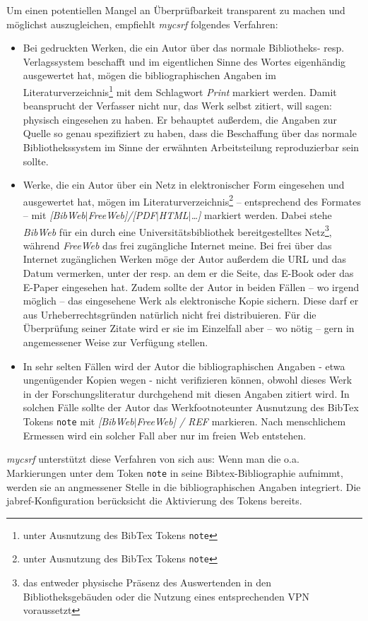 Um einen potentiellen Mangel an Überprüfbarkeit transparent zu machen und
möglichst auszugleichen, empfiehlt \emph{mycsrf} folgendes Verfahren:

\begin{itemize}
  \item Bei gedruckten Werken, die ein Autor über das normale Bibliotheks- resp.
  Verlagssystem beschafft und im eigentlichen Sinne des Wortes eigenhändig
  ausgewertet hat, mögen die bibliographischen Angaben im
  Literaturverzeichnis\footnote{unter Ausnutzung des BibTex Tokens
  \texttt{note}} mit dem Schlagwort \emph{Print} markiert werden. Damit
  beansprucht der Verfasser nicht nur, das Werk selbst zitiert, will sagen:
  physisch eingesehen zu haben. Er behauptet außerdem, die Angaben zur Quelle so
  genau spezifiziert zu haben, dass die Beschaffung über das normale
  Bibliothekssystem im Sinne der erwähnten Arbeitsteilung reproduzierbar sein
  sollte.
  \item Werke, die ein Autor über ein Netz in elektronischer Form eingesehen und
  ausgewertet hat, mögen im Literaturverzeichnis\footnote{unter Ausnutzung des
  BibTex Tokens \texttt{note}}  -- entsprechend des Formates -- mit
  \emph{[BibWeb$|$FreeWeb]/[PDF$|$HTML$|$\ldots]} markiert werden. Dabei stehe
  \emph{BibWeb} für ein durch eine Universitätsbibliothek bereitgestelltes
  Netz\footnote{das entweder physische Präsenz des Auswertenden in den
  Bibliotheksgebäuden oder die Nutzung eines entsprechenden VPN voraussetzt},
  während \emph{FreeWeb} das frei zugängliche Internet meine. Bei frei über das
  Internet zugänglichen Werken möge der Autor außerdem die URL und das Datum
  vermerken, unter der resp. an dem er die Seite, das E-Book oder das E-Paper
  eingesehen hat. Zudem sollte der Autor in beiden Fällen -- wo irgend möglich
  -- das eingesehene Werk als elektronische Kopie sichern. Diese darf er aus
  Urheberrechtsgründen natürlich nicht frei distribuieren. Für die Überprüfung
  seiner Zitate wird er sie im Einzelfall aber -- wo nötig -- gern in
  angemessener Weise zur Verfügung stellen.
  \item In sehr selten Fällen wird der Autor die bibliographischen Angaben -
  etwa ungenügender Kopien wegen - nicht verifizieren können, obwohl dieses Werk
  in der Forschungsliteratur durchgehend mit diesen Angaben zitiert wird. In
  solchen Fälle sollte der Autor das Werkfootnote{unter Ausnutzung
  des BibTex Tokens \texttt{note}} mit \emph{[BibWeb$|$FreeWeb] / REF}
  markieren.
  Nach menschlichem Ermessen wird ein solcher Fall aber nur im freien Web
  entstehen.
\end{itemize}

\emph{mycsrf} unterstützt diese Verfahren von sich aus: Wenn man die o.a.
Markierungen unter dem Token \texttt{note} in seine Bibtex-Bibliographie
aufnimmt, werden sie an angmessener Stelle in die bibliographischen Angaben
integriert. Die jabref-Konfiguration berücksicht die Aktivierung des Tokens
bereits.
%

